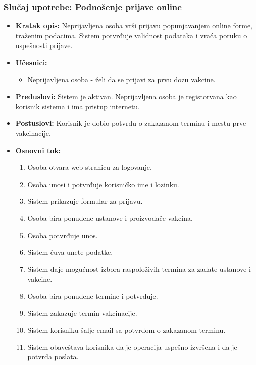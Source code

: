 \documentclass[titlepage]{article}
\begin{document}
\subsubsection{Slučaj upotrebe: Podnošenje prijave online}
\begin{itemize}
    \item \textbf{Kratak opis:} Neprijavljena osoba vrši prijavu popunjavanjem online forme, traženim podacima. Sistem potvrđuje validnost podataka i vraća poruku o uspešnosti prijave.
    \item \textbf{Učesnici:}
        \begin{itemize}
            \item Neprijavljena osoba - želi da se prijavi za prvu dozu vakcine.
        \end{itemize}
    \item \textbf{Preduslovi:} Sistem je aktivan. Neprijavljena osoba je registorvana kao korisnik sistema i ima pristup internetu.
    \item \textbf{Postuslovi:} Korisnik je dobio potvrdu o zakazanom terminu i mestu prve vakcinacije.
    \item \textbf{Osnovni tok:}
        \begin{enumerate}
            \item Osoba otvara web-stranicu za logovanje.
	    \item Osoba unosi i potvrđuje korisničko ime i lozinku.
            \item Sistem prikazuje formular za prijavu.
            \item Osoba bira ponuđene ustanove i proizvođače vakcina.
            \item Osoba potvrđuje unos.
            \item Sistem čuva unete podatke.
	    \item Sistem daje mogućnost izbora raspoloživih termina za zadate ustanove i vakcine.
	    \item Osoba bira ponuđene termine i potvrđuje. 
            \item Sistem zakazuje termin vakcinacije.
	    \item Sistem korisniku šalje email sa potvrdom o zakazanom terminu.
            \item Sistem obaveštava korisnika da je operacija uspešno izvršena i da je potvrda poslata.
	\end{enumerate}
     
    

\end{itemize}
\end{document}
